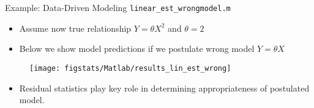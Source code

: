 \documentclass[9pt]{beamer}
\begin{document}
%
\begin{frame}{Example: Data-Driven Modeling \footnotesize{\texttt{linear\_est\_wrongmodel.m}}}

\begin{block}{}
\begin{itemize}
\setlength{\itemsep}{5pt}
\item Assume now true relationship $Y=\theta X^2$ and $\theta=2$
\item Below we show model predictions if we postulate wrong model $Y=\theta X$
\end{itemize}
\end{block}

\begin{figure}[!htb]
    \centering
	\texttt{[image: figstats/Matlab/results\_lin\_est\_wrong]}
\end{figure}

\begin{itemize}
\item Residual statistics play key role in determining appropriateness of postulated model.
\end{itemize}

\end{frame}
\end{document}
